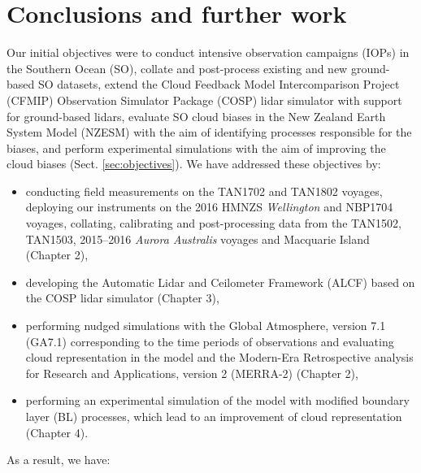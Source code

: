 \chapter{Conclusions and further work}

Our initial objectives were to conduct intensive observation campaigns (IOPs)
in the Southern Ocean (SO), collate and post-process existing and new
ground-based SO datasets, extend the Cloud Feedback Model Intercomparison
Project (CFMIP) Observation Simulator Package (COSP) lidar simulator with support for
ground-based lidars, evaluate SO cloud biases in the New Zealand Earth System
Model (NZESM) with the aim
of identifying processes responsible for the biases, and perform
experimental simulations with the aim of improving the cloud biases
(Sect. \ref{sec:objectives}). We have addressed these objectives by:

\begin{itemize}
\item conducting field measurements on the TAN1702 and TAN1802 voyages,
deploying our instruments on the 2016 HMNZS \textit{Wellington} and NBP1704 voyages,
collating, calibrating and post-processing data from the TAN1502, TAN1503,
2015--2016 \textit{Aurora
Australis} voyages and Macquarie Island (Chapter 2),
\item developing the Automatic Lidar and Ceilometer Framework (ALCF) 
based on the COSP lidar simulator (Chapter 3),
\item performing nudged simulations with the Global Atmosphere, version 7.1
(GA7.1) corresponding to the
time periods of observations and evaluating cloud representation in the model
and the Modern-Era Retrospective analysis for
Research and Applications, version 2 (MERRA-2) (Chapter 2),
\item performing an experimental simulation of the model with modified
boundary layer (BL) processes, which lead to an improvement of cloud representation
(Chapter 4).
\end{itemize}

\noindent
As a result, we have:

